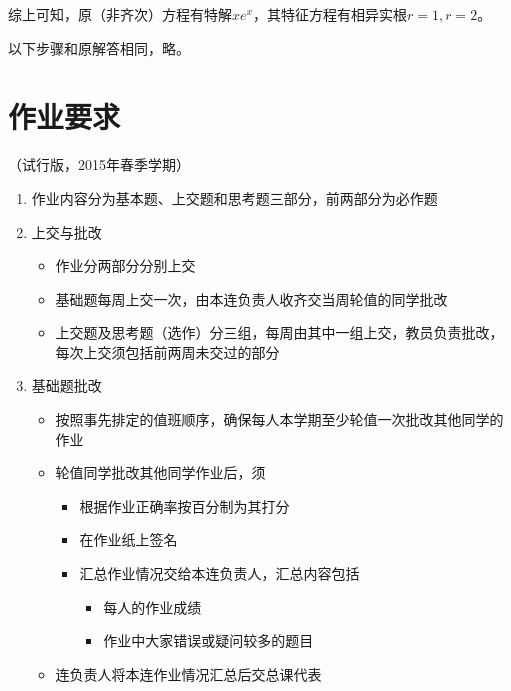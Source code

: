 	综上可知，原（非齐次）方程有特解$xe^x$，其特征方程有相异实根$r=1,r=2$。
	
	以下步骤和原解答相同，略。
	
	\newpage
	
	\section*{作业要求}
	
	\begin{center}
		（试行版，2015年春季学期）
	\end{center}
	
	\begin{enumerate}
	  \item 作业内容分为基本题、上交题和思考题三部分，前两部分为必作题
	  \item 上交与批改
	  \begin{itemize}
	    \item 作业分两部分分别上交
	    \item 基础题每周上交一次，由本连负责人收齐交当周轮值的同学批改
	    \item 上交题及思考题（选作）分三组，每周由其中一组上交，教员负责批改，
	    每次上交须包括前两周未交过的部分
	  \end{itemize}
	  \item 基础题批改
	  \begin{itemize}
	    \item 按照事先排定的值班顺序，确保每人本学期至少轮值一次批改其他同学的作业
	    \item 轮值同学批改其他同学作业后，须
	    \begin{itemize}
	      \item 根据作业正确率按百分制为其打分
	      \item 在作业纸上签名
	      \item 汇总作业情况交给本连负责人，汇总内容包括
	      \begin{itemize}
	        \item 每人的作业成绩
	        \item 作业中大家错误或疑问较多的题目
	      \end{itemize}
	    \end{itemize}
	    \item 连负责人将本连作业情况汇总后交总课代表
	  \end{itemize}
	\end{enumerate}
	
	\newpage

